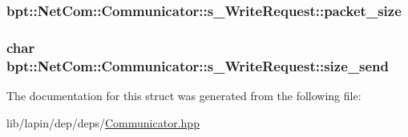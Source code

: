 \hypertarget{structbpt_1_1_net_com_1_1_communicator_1_1s___write_request_a66ca016d0aff39ac79254a91e2ede07a}{
\subsubsection[{packet\-\_\-size}]{ bpt\-::\-Net\-Com\-::\-Communicator\-::s\-\_\-\-Write\-Request\-::packet\-\_\-size}}\label{structbpt_1_1_net_com_1_1_communicator_1_1s___write_request_a66ca016d0aff39ac79254a91e2ede07a}
\hypertarget{structbpt_1_1_net_com_1_1_communicator_1_1s___write_request_a00ea35c36ef36c939728a40a70eb2191}{
\subsubsection[{size\-\_\-send}]{ char bpt\-::\-Net\-Com\-::\-Communicator\-::s\-\_\-\-Write\-Request\-::size\-\_\-send}}\label{structbpt_1_1_net_com_1_1_communicator_1_1s___write_request_a00ea35c36ef36c939728a40a70eb2191}


The documentation for this struct was generated from the following file\-:\begin{DoxyCompactItemize}
\item 
lib/lapin/dep/deps/\hyperlink{_communicator_8hpp}{Communicator.\-hpp}\end{DoxyCompactItemize}
